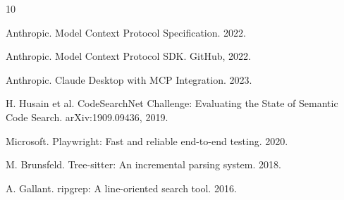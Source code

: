\documentclass[11pt,twocolumn]{article}
\begin{document}

\begin{thebibliography}{10}

Anthropic. Model Context Protocol Specification. 2022.

Anthropic. Model Context Protocol SDK. GitHub, 2022.

Anthropic. Claude Desktop with MCP Integration. 2023.

H. Husain et al. CodeSearchNet Challenge: Evaluating the State of Semantic Code Search. arXiv:1909.09436, 2019.

Microsoft. Playwright: Fast and reliable end-to-end testing. 2020.

M. Brunsfeld. Tree-sitter: An incremental parsing system. 2018.

A. Gallant. ripgrep: A line-oriented search tool. 2016.

\end{thebibliography}
\end{document}
